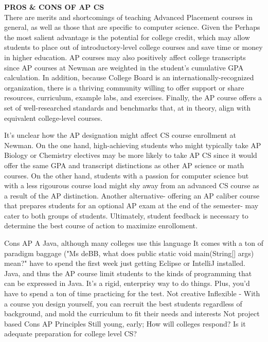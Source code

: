 \textbf{PROS & CONS OF AP CS} \\
There are merits and shortcomings of teaching Advanced Placement courses in general, as well as those that are specific to computer science. Given the 
Perhaps the most salient advantage is the potential for college credit, which may allow students to place out of introductory-level college courses and save time or money in higher education. AP courses may also positively affect college transcripts since AP courses at Newman are weighted in the student’s cumulative GPA calculation. In addition, because College Board is an internationally-recognized organization, there is a thriving community willing to offer support or share resources, curriculum, example labs, and exercises. Finally, the AP course offers a set of well-researched standards and benchmarks that, at in theory, align with equivalent college-level courses. \par
It's unclear how the AP designation might affect CS course enrollment at Newman. On the one hand, high-achieving students who might typically take AP Biology or Chemistry electives may be more likely to take AP CS since it would offer the same GPA and transcript distinctions as other AP science or math courses. On the other hand, students with a passion for computer science but with a less rigourous course load might shy away from an advanced CS course as a result of the AP distinction. Another alternative- offering an AP caliber course that prepares students for an optional AP exam at the end of the semester- may cater to both groups of students. Ultimately, student feedback is necessary to determine the best course of action to maximize enrolloment. \par
Cons AP A
Java, although many colleges use this language
It comes with a ton of paradigm baggage ("Ms deBB, what does public static void main(String[] args) mean?"
have to spend the first week just getting Eclipse or IntelliJ installed.
Java, and thus the AP course limit students to the kinds of programming that can be expressed in Java. It's a rigid, enterprisy way to do things.
Plus, you'd have to spend a ton of time practicing for the test.
Not creative
Inflexible - With a course you design yourself, you can recruit the best students regardless of background, and mold the curriculum to fit their needs and interests
Not project based
Cons AP Principles
 Still young, early; 
How will colleges respond? Is it adequate preparation for college level CS?



